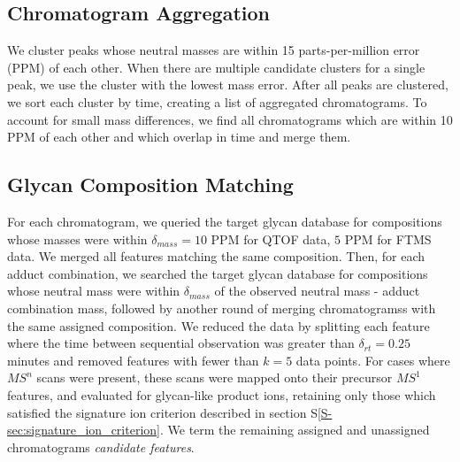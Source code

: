 \subsection{Chromatogram Aggregation}
        We cluster peaks whose neutral masses are within 15 parts-per-million error
    (PPM) of each other. When there are multiple candidate clusters for a single peak,
    we use the cluster with the lowest mass error. After all peaks are clustered,
    we sort each cluster by time, creating a list of aggregated chromatograms. To account
    for small mass differences, we find all chromatograms which are within 10 PPM of each
    other and which overlap in time and merge them.

\subsection{Glycan Composition Matching}
        For each chromatogram, we queried the target glycan database for compositions
    whose masses were within $\delta_{mass} = 10$ PPM for QTOF data, $5$ PPM
    for FTMS data. We merged all features matching the same composition. Then, for
    each adduct combination, we searched the target glycan database for compositions
    whose neutral mass were within $\delta_{mass}$ of the observed neutral mass - adduct
    combination mass, followed by another round of merging chromatogramss with the same
    assigned composition. We reduced the data by splitting each feature where the time
    between sequential observation was greater than $\delta_{rt} = 0.25$ minutes and
    removed features with fewer than $k = 5$ data points. For cases where $MS^n$ scans were
    present, these scans were mapped onto their precursor $MS^1$ features, and evaluated for
    glycan-like product ions, retaining only those which satisfied the signature ion
    criterion described in section S\ref{S-sec:signature_ion_criterion}. We term the
    remaining assigned and unassigned chromatograms \textit{candidate features}.
